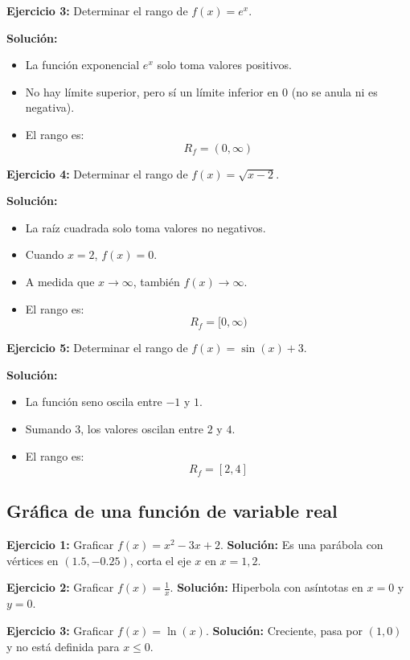 \documentclass{profesor}
\begin{document}
\textbf{Ejercicio 3:} Determinar el rango de \( f(x) = e^x \).

\textbf{Solución:}  
\begin{itemize}
    \item La función exponencial \( e^x \) solo toma valores positivos.
    \item No hay límite superior, pero sí un límite inferior en \( 0 \) (no se anula ni es negativa).
    \item El rango es:
    \[
    R_f = (0, \infty)
    \]
\end{itemize}

\textbf{Ejercicio 4:} Determinar el rango de \( f(x) = \sqrt{x-2} \).

\textbf{Solución:}  
\begin{itemize}
    \item La raíz cuadrada solo toma valores no negativos.
    \item Cuando \( x = 2 \), \( f(x) = 0 \).
    \item A medida que \( x \to \infty \), también \( f(x) \to \infty \).
    \item El rango es:
    \[
    R_f = [0, \infty)
    \]
\end{itemize}

\textbf{Ejercicio 5:} Determinar el rango de \( f(x) = \sin(x) + 3 \).

\textbf{Solución:}  
\begin{itemize}
    \item La función seno oscila entre \( -1 \) y \( 1 \).
    \item Sumando 3, los valores oscilan entre \( 2 \) y \( 4 \).
    \item El rango es:
    \[
    R_f = [2, 4]
    \]
\end{itemize}

\newpage
\subsection{Gráfica de una función de variable real}

\textbf{Ejercicio 1:} Graficar \( f(x) = x^2 - 3x + 2 \).  
\textbf{Solución:} Es una parábola con vértices en \( (1.5, -0.25) \), corta el eje \( x \) en \( x = 1, 2 \).  

\textbf{Ejercicio 2:} Graficar \( f(x) = \frac{1}{x} \).  
\textbf{Solución:} Hiperbola con asíntotas en \( x=0 \) y \( y=0 \).  

\textbf{Ejercicio 3:} Graficar \( f(x) = \ln(x) \).  
\textbf{Solución:} Creciente, pasa por \( (1,0) \) y no está definida para \( x \leq 0 \).  
\end{document}
